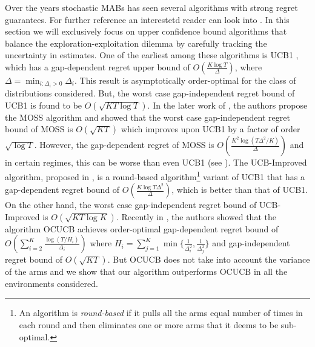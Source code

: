 
	Over the years stochastic MABs has seen several algorithms with strong regret guarantees. For  further reference an interestetd reader can look into \citet{bubeck2012bandits}. In this section we will exclusively focus on upper confidence bound algorithms that balance the exploration-exploitation dilemma by carefully tracking the uncertainty in estimates. One of the earliest among these algorithms is UCB1 \citep{auer2002finite}, which has a gap-dependent regret upper bound of  $O\left(\frac{K\log T}{\Delta}\right)$, where $\Delta = \min_{i:\Delta_i>0} \Delta_i$. This result is asymptotically order-optimal for the class of distributions considered. But, the worst case gap-independent regret bound of UCB1 is found to be  $O \left(\sqrt{KT\log T}\right)$. In the later work of \citet{audibert2009minimax}, the authors propose the MOSS algorithm and showed that the worst case gap-independent regret bound of MOSS is $O\left( \sqrt{KT} \right)$ which improves upon UCB1 by a factor of order $\sqrt{\log T}$. However, the gap-dependent regret of MOSS is  $O\left( \frac{K^{2}\log\left(T\Delta^{2}/K\right)}{\Delta}\right)$ and in certain regimes, this can be worse than even UCB1 (see \citet{audibert2009minimax,lattimore2015optimally}). The UCB-Improved algorithm, proposed in \citet{auer2010ucb}, is a round-based algorithm\footnote{An algorithm is \textit{round-based} if it pulls all the arms equal number of times in each round and then eliminates one or more arms that it deems  to be sub-optimal.} variant of UCB1 that 
has a gap-dependent regret bound of $O\left(\frac{K\log T\Delta^{2}}{\Delta}\right)$, which is better than that of UCB1. On the other hand, the worst case gap-independent regret bound of UCB-Improved is $O\left(\sqrt{KT\log K}\right)$. Recently in \citet{lattimore2015optimally}, the authors showed that  the algorithm OCUCB achieves order-optimal gap-dependent regret bound of $O\left(\sum_{i=2}^{K}\frac{\log\left(T/H_i\right)}{\Delta_i}\right)$ where $H_i=\sum_{j=1}^{K}\min\lbrace \frac{1}{\Delta_i^2},\frac{1}{\Delta_j^2}\rbrace$ and gap-independent regret bound of $O\left( \sqrt{KT}\right)$. But OCUCB does not take into account the variance of the arms and we show that our algorithm outperforms OCUCB in all the environments considered. 

